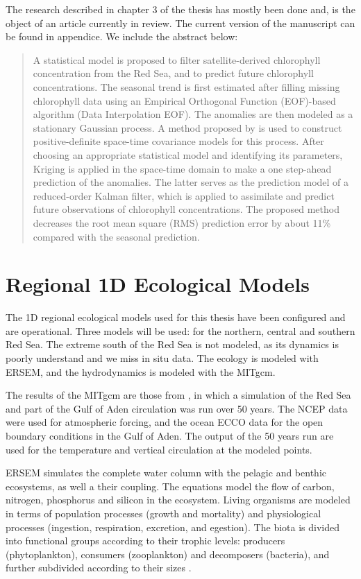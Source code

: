 The research described in chapter 3 of the thesis has mostly been
done and, is the object of an article currently in review. The current version
of the manuscript can be found in appendice. We include the abstract below:

\begin{quotation}
A statistical model is proposed to filter satellite-derived chlorophyll
concentration from the Red Sea, and to predict future chlorophyll
concentrations. The seasonal trend is first estimated after filling missing
chlorophyll data using an Empirical Orthogonal Function (EOF)-based algorithm
(Data Interpolation EOF). The anomalies are then modeled as a stationary
Gaussian process. A method proposed by \citet{Gneiting2002} is used to
construct positive-definite space-time covariance models for this process.
After choosing an appropriate statistical model and identifying its parameters,
Kriging is applied in the space-time domain to make a one step-ahead prediction
of the anomalies. The latter serves as the prediction model of a reduced-order
Kalman filter, which is applied to assimilate and predict future observations
of chlorophyll concentrations. The proposed method decreases the root mean
square (RMS) prediction error by about 11\% compared with the seasonal
prediction.
\end{quotation}

\section{Regional 1D Ecological Models}

The 1D regional ecological models used for this thesis have been configured and
are operational. Three models will be used: for the northern, central and
southern Red Sea. The extreme south of the Red Sea is not modeled, as its dynamics
is poorly understand and we miss in situ data.
The ecology is modeled with ERSEM, and the hydrodynamics is
modeled with the MITgcm.

The results of the MITgcm are those from \citet{Yao2014, Yao2014b}, in which a
simulation of the Red Sea and part of the Gulf of Aden circulation was run over
50 years. The NCEP data were used for atmospheric forcing, and the ocean ECCO
data for the open boundary conditions in the Gulf of Aden. The output of the 50
years run are used for the temperature and vertical circulation at the modeled
points.

ERSEM simulates the complete water column with the pelagic and benthic
ecosystems, as well a their coupling. The equations model the flow of carbon,
nitrogen, phosphorus and silicon in the ecosystem. Living organisms are modeled
in terms of population processes (growth and mortality) and physiological
processes (ingestion, respiration, excretion, and egestion). The biota is
divided into functional groups according to their trophic levels: producers
(phytoplankton), consumers (zooplankton) and decomposers (bacteria), and
further subdivided according to their sizes \citep{Baretta1995}.


